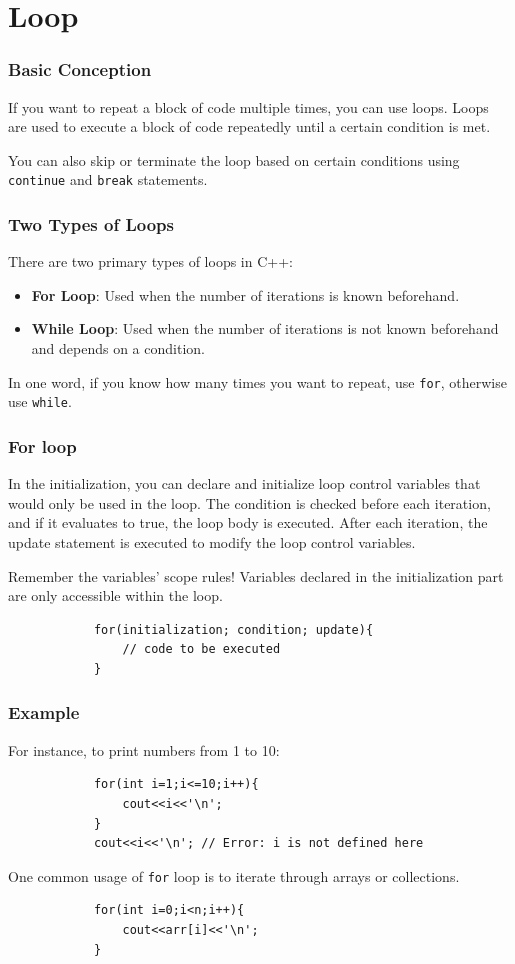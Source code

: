 \documentclass[xcolor=dvipsnames]{beamer}
\begin{document}
    \section{Loop}
    \begin{frame}
        \frametitle{Basic Conception}
        If you want to repeat a block of code multiple times, you can use loops. Loops are used to execute a block of code repeatedly until a certain condition is met.

        You can also skip or terminate the loop based on certain conditions using \texttt{continue} and \texttt{break} statements.
    \end{frame}
    \begin{frame}
        \frametitle{Two Types of Loops}
        There are two primary types of loops in C++:
        \begin{itemize}
            \item \textbf{For Loop}: Used when the number of iterations is known beforehand.
            \item \textbf{While Loop}: Used when the number of iterations is not known beforehand and depends on a condition.
        \end{itemize}
        In one word, if you know how many times you want to repeat, use \texttt{for}, otherwise use \texttt{while}.
    \end{frame}
    \begin{frame}[fragile]
        \frametitle{For loop}
        In the initialization, you can declare and initialize loop control variables that would only be used in the loop. The condition is checked before each iteration, and if it evaluates to true, the loop body is executed. After each iteration, the update statement is executed to modify the loop control variables.

        Remember the variables' scope rules! Variables declared in the initialization part are only accessible within the loop.
        \begin{verbatim}
            for(initialization; condition; update){
                // code to be executed
            }
        \end{verbatim}
    \end{frame}
    \begin{frame}[fragile]
        \frametitle{Example}
        For instance, to print numbers from 1 to 10:
        \begin{verbatim}
            for(int i=1;i<=10;i++){
                cout<<i<<'\n';
            }
            cout<<i<<'\n'; // Error: i is not defined here
        \end{verbatim}
        One common usage of \texttt{for} loop is to iterate through arrays or collections.
        \begin{verbatim}
            for(int i=0;i<n;i++){
                cout<<arr[i]<<'\n';
            }
        \end{verbatim}
    \end{frame}
\end{document}
